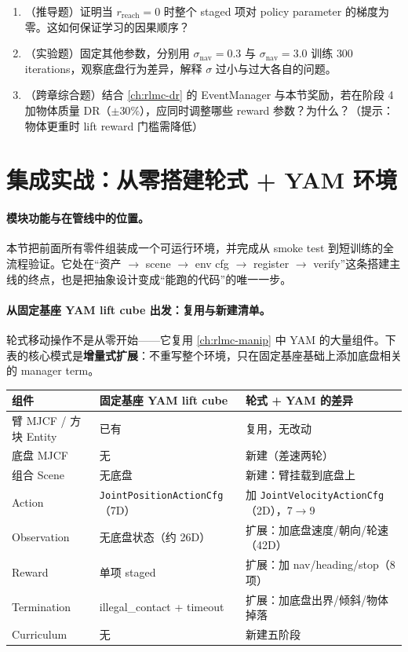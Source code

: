 \begin{practice}[奖励设计]
\begin{enumerate}
\item （推导题）证明当 $r_{\text{reach}}=0$ 时整个 staged 项对 policy parameter 的梯度为零。这如何保证学习的因果顺序？
\item （实验题）固定其他参数，分别用 $\sigma_{\text{nav}}=0.3$ 与 $\sigma_{\text{nav}}=3.0$ 训练 $300$ iterations，观察底盘行为差异，解释 $\sigma$ 过小与过大各自的问题。
\item （跨章综合题）结合 \cref{ch:rlmc-dr} 的 EventManager 与本节奖励，若在阶段 4 加物体质量 DR（$\pm 30\%$），应同时调整哪些 reward 参数？为什么？（提示：物体更重时 lift reward 门槛需降低）
\end{enumerate}
\end{practice}

\section{集成实战：从零搭建轮式 + YAM 环境}
\label{sec:rlmc-wh-integration}

\paragraph{模块功能与在管线中的位置。}本节把前面所有零件组装成一个可运行环境，并完成从 smoke test 到短训练的全流程验证。它处在“资产 $\to$ scene $\to$ env cfg $\to$ register $\to$ verify”这条搭建主线的终点，也是把抽象设计变成“能跑的代码”的唯一一步。

\paragraph{从固定基座 YAM lift cube 出发：复用与新建清单。}轮式移动操作不是从零开始——它复用 \cref{ch:rlmc-manip} 中 YAM 的大量组件。下表的核心模式是\textbf{增量式扩展}：不重写整个环境，只在固定基座基础上添加底盘相关的 manager term。

\begin{center}
\small
\begin{tabular}{@{}llp{3.6cm}@{}}
\toprule
组件 & 固定基座 YAM lift cube & 轮式 + YAM 的差异 \\
\midrule
臂 MJCF / 方块 Entity & 已有 & 复用，无改动 \\
底盘 MJCF & 无 & 新建（差速两轮） \\
组合 Scene & 无底盘 & 新建：臂挂载到底盘上 \\
Action & \verb|JointPositionActionCfg|（7D） & 加 \verb|JointVelocityActionCfg|（2D），7$\to$9 \\
Observation & 无底盘状态（约 26D） & 扩展：加底盘速度/朝向/轮速（42D） \\
Reward & 单项 staged & 扩展：加 nav/heading/stop（8 项） \\
Termination & illegal\_contact + timeout & 扩展：加底盘出界/倾斜/物体掉落 \\
Curriculum & 无 & 新建五阶段 \\
\bottomrule
\end{tabular}
\end{center}

